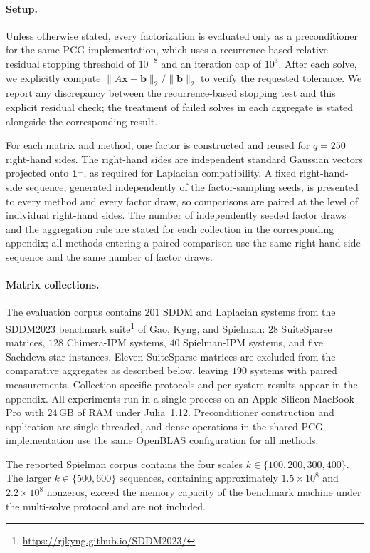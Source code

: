 \documentclass{article}
\newcommand{\1}{\mathbbm{1}}
\theoremstyle{plain}
\begin{document}
\paragraph{Setup.}
Unless otherwise stated, every factorization is evaluated only as a
pre\-conditioner for the same PCG implementation, which uses a
recurrence-based relative-residual stopping threshold of $10^{-8}$ and
an iteration cap of $10^3$. After each solve, we explicitly compute
$\|A\mathbf x-\mathbf b\|_2/\|\mathbf b\|_2$ to verify the requested
tolerance. We report any discrepancy between the recurrence-based
stopping test and this explicit residual check; the treatment of
failed solves in each aggregate is stated alongside the corresponding
result.

For each matrix and method, one factor is constructed and reused for
$q=250$ right-hand sides. The right-hand sides are independent
standard Gaussian vectors projected onto $\mathbf 1^{\perp}$, as
required for Laplacian compatibility. A fixed right-hand-side
sequence, generated independently of the factor-sampling seeds, is
presented to every method and every factor draw, so comparisons are
paired at the level of individual right-hand sides. The number of
independently seeded factor draws and the aggregation rule are stated
for each collection in the corresponding appendix; all methods
entering a paired comparison use the same right-hand-side sequence and
the same number of factor draws.

\paragraph{Matrix collections.}
The evaluation corpus contains $201$ SDDM and Laplacian systems from
the SDDM2023 benchmark
suite\footnote{\url{https://rjkyng.github.io/SDDM2023/}} of Gao, Kyng,
and Spielman: $28$ Suite\-Sparse matrices, $128$ Chimera-IPM systems,
$40$ Spielman-IPM systems, and five Sachdeva-star instances. Eleven
Suite\-Sparse matrices are excluded from the comparative aggregates
as described below, leaving $190$ systems with paired measurements.
Collection-specific protocols and per-system results appear in the
appendix. All experiments run in a single process on an Apple Silicon MacBook
Pro with $24$\,GB of RAM under Julia~1.12. Pre\-conditioner
construction and application are single-threaded, and dense operations
in the shared PCG implementation use the same OpenBLAS configuration
for all methods.

The reported Spielman corpus contains the four scales
$k\in\{100,200,300,400\}$. The larger $k\in\{500,600\}$ sequences,
containing approximately $1.5\times10^8$ and $2.2\times10^8$
non\-zeros, exceed the memory capacity of the benchmark machine under
the multi-solve protocol and are not included.
\end{document}
